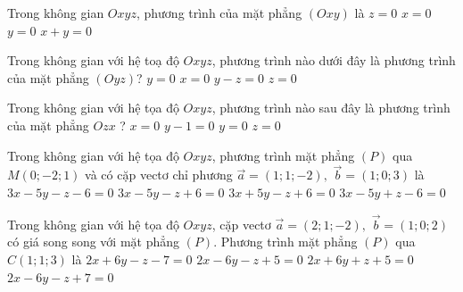 \begin{ex}%
	Trong không gian $Oxyz$, phương trình của mặt phẳng $(Oxy)$ là
	\choice
	{\True $z=0$}
	{$x=0$}
	{$y=0$}
	{$x+y=0$}
\end{ex}

\begin{ex}%
	Trong không gian với hệ toạ độ $Oxyz$, phương trình nào dưới đây là phương trình của mặt phẳng $(Oyz)$?
	\choice
	{$y=0$}
	{\True $x=0$}
	{$y-z=0$}
	{$z=0$}
\end{ex}
\begin{ex}%
	Trong không gian với hệ tọa độ $O x y z$, phương trình nào sau đây là phương trình của mặt phẳng $O z x$ ?
	\choice
	{$x=0$}
	{$y-1=0$}
	{\True $y=0$}
	{$z=0$}
\end{ex}

\begin{ex}%
	Trong không gian với hệ tọa độ $O x y z$, phương trình mặt phẳng $(P)$ qua $M(0 ;-2 ; 1)$ và có cặp vectơ  chỉ phương $\vec{a}=(1 ; 1 ;-2),$ $ \vec{b}=(1 ; 0 ; 3)$ là
	\choice
	{\True $3 x-5 y-z-6=0$}
	{$3 x-5 y-z+6=0$}
	{$3 x+5 y-z+6=0$}
	{$3 x-5 y+z-6=0$}
\end{ex}
\begin{ex}%
	Trong không gian với hệ tọa độ $O x y z$, cặp vectơ  $\vec{a}=(2 ; 1 ;-2), $ $\vec{b}=(1 ; 0 ; 2)$ có giá song song với mặt phẳng $(P)$. Phương trình mặt phẳng $(P)$ qua $C(1 ; 1 ; 3)$ là
	\choice
	{$2 x+6 y-z-7=0$}
	{$2 x-6 y-z+5=0$}
	{$2 x+6 y+z+5=0$}
	{\True $2 x-6 y-z+7=0$}
\end{ex}

